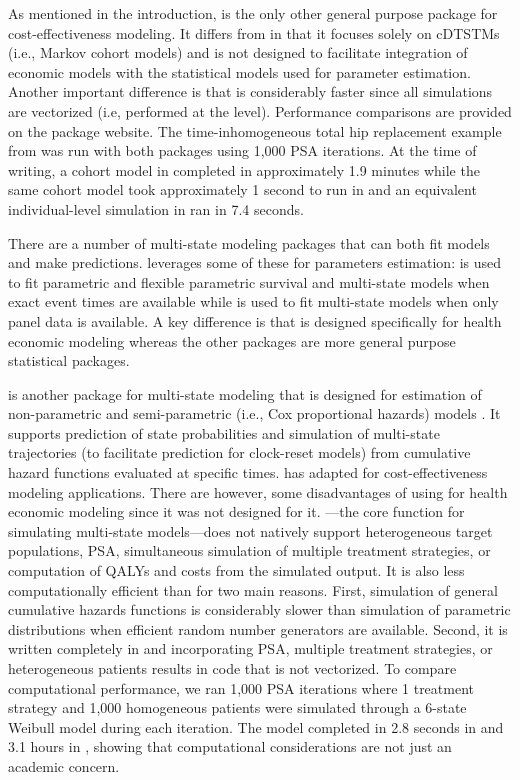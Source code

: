 \documentclass[article, nojss]{jss}\usepackage[]{graphicx}\usepackage[]{color}
\begin{document}
As mentioned in the introduction,  is the only other general purpose  package for cost-effectiveness modeling. It differs from  in that it focuses solely on cDTSTMs (i.e., Markov cohort models) and is not designed to facilitate integration of economic models with the statistical models used for parameter estimation. Another important difference is that  is considerably faster since all simulations are vectorized (i.e, performed at the  level). Performance comparisons are provided on the package website. The time-inhomogeneous total hip replacement example from \citet{briggs2006decision} was run with both packages using 1,000 PSA iterations. At the time of writing, a cohort model in  completed in approximately 1.9 minutes while the same cohort model took approximately 1 second to run in  and an equivalent individual-level simulation in  ran in 7.4 seconds. 

There are a number of multi-state modeling  packages that can both fit models and make predictions.  leverages some of these for parameters estimation:  is used to fit parametric and flexible parametric survival and multi-state models when exact event times are available while  is used to fit multi-state models when only panel data is available. A key difference is that  is designed specifically for health economic modeling whereas the other packages are more general purpose statistical packages. 

 is another package for multi-state modeling that is designed for estimation of non-parametric and semi-parametric (i.e., Cox proportional hazards) models \citep{de2011mstate}. It supports prediction of state probabilities and simulation of multi-state trajectories (to facilitate prediction for clock-reset models) from cumulative hazard functions evaluated at specific times. \citet{williams2017cost} has adapted  for cost-effectiveness modeling applications. There are however, some disadvantages of using  for health economic modeling since it was not designed for it. ---the core function for simulating multi-state models---does not natively support heterogeneous target populations, PSA, simultaneous simulation of multiple treatment strategies, or computation of QALYs and costs from the simulated output. It is also less computationally efficient than  for two main reasons. First, simulation of general cumulative hazards functions is considerably slower than simulation of parametric distributions when efficient random number generators are available. Second, it is written completely in  and incorporating PSA, multiple treatment strategies, or heterogeneous patients results in code that is not vectorized. To compare computational performance, we ran 1,000 PSA iterations where 1 treatment strategy and 1,000 homogeneous patients were simulated through a 6-state Weibull model during each iteration. The model completed in 2.8 seconds in  and 3.1 hours in , showing that computational considerations are not just an academic concern. 
\end{document}
